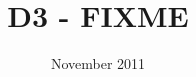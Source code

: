 


\title{D3 - FIXME}
\date{November 2011}

 

%

\maketitle

\thispagestyle{empty}
\tableofcontents
\thispagestyle{empty}
\listoffigures
\listoftables
\newpage







%
%
% 
%


{\small}

